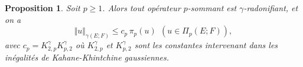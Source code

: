 \documentclass{smfart}
\theoremstyle{plain}
\newtheorem{proposition}[theorem]{Proposition}
\theoremstyle{definition}
\newcommand{\EE}{\mathbb E}
\newcommand{\demi}{{\nicefrac{1}{2}}}
\begin{document}
\begin{proposition} \label{prop:p-sommant-implique-radonifiant}
Soit $p\ge 1$. Alors tout opérateur $p$-sommant
 est $\gamma$-radonifiant, et on a
\[
    \Vert u \Vert_{\gamma(E; F)}\le  c_p\, \pi_p(u) \ \ (u \in \Pi_{p}(E; F)),
\]
avec $c_p=K^{\gamma}_{2,p}K^{\gamma}_{p,2}$ où $K^{\gamma}_{2,p}$ et
$K^{\gamma}_{p,2}$ sont les constantes intervenant dans les
inégalités de Kahane-Khintchine gaussiennes.
\end{proposition}
% 
%  
\end{document}
